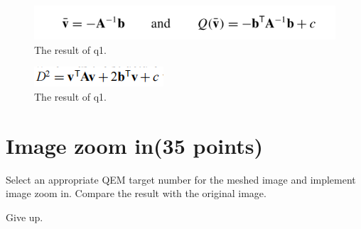 \documentclass[]{article}
\begin{document}
\begin{figure}[ht]
    \centering 
    \includegraphics[width=1\columnwidth]{eq3.png} 
    \caption{The result of q1.}
    \label{fig:eq3} 
\end{figure}

\begin{figure}[ht]
    \centering 
    \includegraphics[width=0.5\columnwidth]{eq4.png} 
    \caption{The result of q1.}
    \label{fig:eq4} 
\end{figure}
\newpage
\section{Image zoom in(35 points)}
Select an appropriate QEM target number for the meshed image and implement image zoom in. Compare the result with the original image.

Give up.
\end{document}
